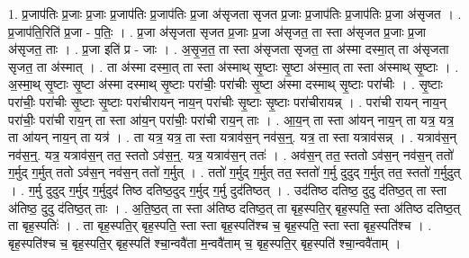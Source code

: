 \documentclass[17pt]{extarticle}
\begin{document}
1. प्र॒जाप॑तिः प्र॒जाः प्र॒जाः प्र॒जाप॑तिः प्र॒जाप॑तिः प्र॒जा अ॑सृजता सृजत प्र॒जाः प्र॒जाप॑तिः प्र॒जाप॑तिः प्र॒जा अ॑सृजत । . प्र॒जाप॑ति॒रिति॑ प्र॒जा - प॒तिः॒ । . प्र॒जा अ॑सृजता सृजत प्र॒जाः प्र॒जा अ॑सृजत॒ ता स्ता अ॑सृजत प्र॒जाः प्र॒जा अ॑सृजत॒ ताः । . प्र॒जा इति॑ प्र - जाः । . अ॒सृ॒ज॒त॒ ता स्ता अ॑सृजता सृजत॒ ता अ॑स्मा दस्मा॒त् ता अ॑सृजता सृजत॒ ता अ॑स्मात् । . ता अ॑स्मा दस्मा॒त् ता स्ता अ॑स्माथ् सृ॒ष्टाः सृ॒ष्टा अ॑स्मा॒त् ता स्ता अ॑स्माथ् सृ॒ष्टाः । . अ॒स्मा॒थ् सृ॒ष्टाः सृ॒ष्टा अ॑स्मा दस्माथ् सृ॒ष्टाः परा॑चीः॒ परा॑चीः सृ॒ष्टा अ॑स्मा दस्माथ् सृ॒ष्टाः परा॑चीः । . सृ॒ष्टाः परा॑चीः॒ परा॑चीः सृ॒ष्टाः सृ॒ष्टाः परा॑चीरायन् नाय॒न् परा॑चीः सृ॒ष्टाः सृ॒ष्टाः परा॑चीरायन्न् । . परा॑ची रायन् नाय॒न् परा॑चीः॒ परा॑ची राय॒न् ता स्ता आ॑य॒न् परा॑चीः॒ परा॑ची राय॒न् ताः । . आ॒य॒न् ता स्ता आ॑यन् नाय॒न् ता यत्र॒ यत्र॒ ता आ॑यन् नाय॒न् ता यत्र॑ । . ता यत्र॒ यत्र॒ ता स्ता यत्राव॑स॒न् नव॑स॒न्॒. यत्र॒ ता स्ता यत्राव॑सन्न् । . यत्राव॑स॒न् नव॑स॒न्॒. यत्र॒ यत्राव॑स॒न् तत॒ स्ततो ऽव॑स॒न्॒. यत्र॒ यत्राव॑स॒न् ततः॑ । . अव॑स॒न् तत॒ स्ततो ऽव॑स॒न् नव॑स॒न् ततो॑ ग॒र्मुद् ग॒र्मुत् ततो ऽव॑स॒न् नव॑स॒न् ततो॑ ग॒र्मुत् । . ततो॑ ग॒र्मुद् ग॒र्मुत् तत॒ स्ततो॑ ग॒र्मु दुदुद् ग॒र्मुत् तत॒ स्ततो॑ ग॒र्मुदुत् । . ग॒र्मु दुदुद् ग॒र्मुद् ग॒र्मुदुद॑ तिष्ठ दतिष्ठ॒दुद् ग॒र्मुद् ग॒र्मु दुद॑तिष्ठत् । . उद॑तिष्ठ दतिष्ठ॒ दुदु द॑तिष्ठ॒त् ता स्ता अ॑तिष्ठ॒ दुदु द॑तिष्ठ॒त् ताः । . अ॒ति॒ष्ठ॒त् ता स्ता अ॑तिष्ठ दतिष्ठ॒त् ता बृह॒स्पति॒र् बृह॒स्पति॒ स्ता अ॑तिष्ठ दतिष्ठ॒त् ता बृह॒स्पतिः॑ । . ता बृह॒स्पति॒र् बृह॒स्पति॒ स्ता स्ता बृह॒स्पति॑श्च च॒ बृह॒स्पति॒ स्ता स्ता बृह॒स्पति॑श्च । . बृह॒स्पति॑श्च च॒ बृह॒स्पति॒र् बृह॒स्पति॑ श्चा॒न्ववै॑ता म॒न्ववै॑ताम् च॒ बृह॒स्पति॒र् बृह॒स्पति॑ श्चा॒न्ववै॑ताम् । \newline
\end{document}
